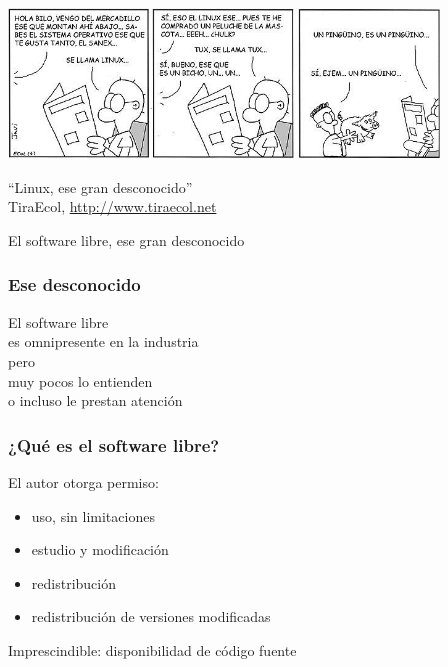 \documentclass[17pt,aspectratio=169]{beamer}
\begin{document}

\begin{frame}

\includegraphics[height=4cm]{figs/tiraecol-5}

\vspace{.5cm}

\begin{flushright}
``Linux, ese gran desconocido'' \\
TiraEcol, \url{http://www.tiraecol.net}
\end{flushright}

\begin{center}
{\huge
El software libre, ese gran desconocido
}
\end{center}

\end{frame}


\begin{frame}
\frametitle{Ese desconocido}

\begin{center}
  {\Large
  El software libre \\
  es omnipresente en la industria \\
  pero \\
  muy pocos lo entienden \\
  o incluso le prestan atención \\
  }
\end{center}

\end{frame}


\begin{frame}
\frametitle{¿Qué es el software libre?}

El autor otorga permiso:

\begin{itemize}
\item uso, sin limitaciones
\item estudio y modificación
\item redistribución
\item redistribución de versiones modificadas
\end{itemize}

Imprescindible: disponibilidad de código fuente

\end{frame}
\end{document}
